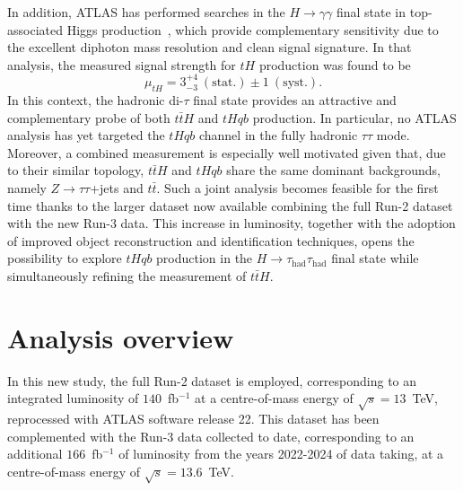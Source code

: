   In addition, ATLAS has performed searches in the $H \to \gamma\gamma$ final state in top-associated Higgs production~\cite{thgammagamma}, which provide complementary sensitivity due to the excellent diphoton mass resolution and clean signal signature. 
  In that analysis, the measured signal strength for $tH$ production was found to be
  \[
  \mu_{tH} = 3^{+4}_{-3}~(\text{stat.}) \pm 1~(\text{syst.}).
  \]    
  In this context, the hadronic di-$\tau$ final state provides an attractive and complementary probe of both $t\bar{t}H$ and $tHqb$ production. 
  In particular, no ATLAS analysis has yet targeted the $tHqb$ channel in the fully hadronic $\tau\tau$ mode. 
  Moreover, a combined measurement is especially well motivated given that, due to their similar topology, $t\bar{t}H$ and $tHqb$ share the same dominant backgrounds, namely $Z\to\tau\tau$+jets and $t\bar{t}$. 
  Such a joint analysis becomes feasible for the first time thanks to the larger dataset now available combining the full Run-2 dataset with the new Run-3 data.
  This increase in luminosity, together with the adoption of improved object reconstruction and identification techniques, opens the possibility to explore $tHqb$ production in the $H\to\tau_{\mathrm{had}}\tau_{\mathrm{had}}$ final state while simultaneously refining the measurement of $t\bar{t}H$.
  



\section{Analysis overview}

In this new study, the full Run-2 dataset is employed, corresponding to an integrated luminosity of $140$~fb$^{-1}$ at a centre-of-mass energy of $\sqrt{s}=13$~TeV, reprocessed with ATLAS software release 22. 
This dataset has been complemented with the Run-3 data collected to date, corresponding to an additional $166$~fb$^{-1}$ of luminosity from the years 2022-2024 of data taking, at a centre-of-mass energy of $\sqrt{s}=13.6$~TeV.

